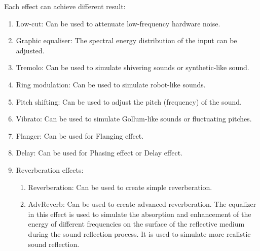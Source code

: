 \documentclass[hidelinks,a4paper,11pt]{article}
\begin{document}
\begin{mdframed}
  Each effect can achieve different result:

  \begin{enumerate}
    \item Low-cut: Can be used to attenuate low-frequency hardware noise.
    \item Graphic equaliser: The spectral energy distribution of the input can be adjusted.
    \item Tremolo: Can be used to simulate shivering sounds or synthetic-like sound.
    \item Ring modulation: Can be used to simulate robot-like sounds.
    \item Pitch shifting: Can be used to adjust the pitch (frequency) of the sound.
    \item Vibrato: Can be used to simulate Gollum-like sounds or fluctuating pitches.
    \item Flanger: Can be used for Flanging effect.
    \item Delay: Can be used for Phasing effect or Delay effect.
    \item Reverberation effects:
    \begin{enumerate}
      \item Reverberation: Can be used to create simple reverberation.
      \item AdvReverb: Can be used to create advanced reverberation. The equalizer in this effect is used to simulate the absorption and enhancement of the energy of different frequencies on the surface of the reflective medium during the sound reflection process. It is used to simulate more realistic sound reflection.    
    \end{enumerate}
  \end{enumerate}

\begin{figure}[H]
  \begin{center}
  \end{center}
\end{figure}

\end{mdframed}
\vspace*{\baselineskip}
\end{document}
